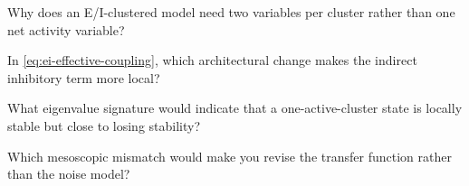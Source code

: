 \begin{conceptquestions}
  \item Why does an E/I-clustered model need two variables per cluster rather than one net activity variable?
  \item In \cref{eq:ei-effective-coupling}, which architectural change makes the indirect inhibitory term more local?
  \item What eigenvalue signature would indicate that a one-active-cluster state is locally stable but close to losing stability?
  \item Which mesoscopic mismatch would make you revise the transfer function rather than the noise model?
\end{conceptquestions}
